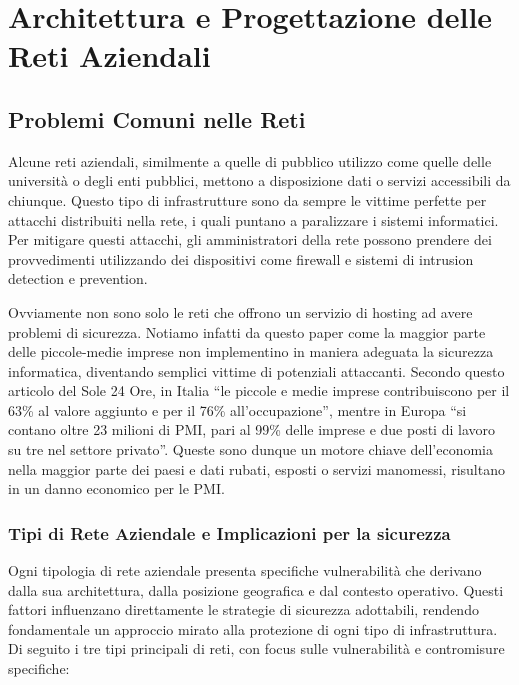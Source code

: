 \hypersetup{linkcolor=blue, citecolor=red}

\chapter{Architettura e Progettazione delle Reti Aziendali} \label{chap:2}

\section{Problemi Comuni nelle Reti}
        Alcune reti aziendali, similmente a quelle di pubblico utilizzo come quelle delle università o degli enti pubblici, mettono a disposizione dati o servizi accessibili da chiunque. Questo tipo di infrastrutture sono da sempre le vittime perfette per attacchi distribuiti nella rete, i quali puntano a paralizzare i sistemi informatici. 
        Per mitigare questi attacchi, gli amministratori della rete possono prendere dei provvedimenti utilizzando dei dispositivi come firewall e sistemi di intrusion detection e prevention.
        
        \vspace{2mm}
        
            Ovviamente non sono solo le reti che offrono un servizio di hosting ad 
            avere problemi di sicurezza. Notiamo infatti da questo paper \cite{smb_security_mesures} come la maggior parte delle piccole-medie imprese non implementino in maniera adeguata la sicurezza informatica, diventando semplici vittime di potenziali attaccanti. Secondo questo articolo \cite{sole_24} del Sole 24 Ore, in Italia “le piccole e medie imprese contribuiscono per il 63\% al valore aggiunto e per il 76\% all'occupazione”, mentre in Europa \cite{eu_site_PMI} “si contano oltre 23 milioni di PMI, pari al 99\% delle imprese e due posti di lavoro su tre nel settore privato”. Queste sono dunque un motore chiave 
            dell'economia nella maggior parte dei paesi e dati rubati, esposti o servizi manomessi, risultano in un danno economico per le PMI.

        
        
        \subsection{Tipi di Rete Aziendale e Implicazioni per la sicurezza}

            Ogni tipologia di rete aziendale presenta specifiche vulnerabilità che 
            derivano dalla sua architettura, dalla posizione geografica e dal 
            contesto operativo. Questi fattori influenzano direttamente le 
            strategie di sicurezza adottabili, rendendo fondamentale un approccio 
            mirato alla protezione di ogni tipo di infrastruttura.
            Di seguito i tre tipi principali di reti, con focus sulle vulnerabilità 
            e contromisure specifiche:

